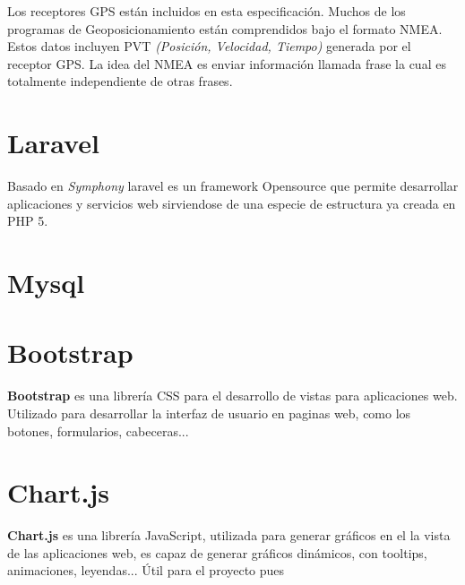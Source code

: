  Los receptores GPS están incluidos en esta especificación. Muchos de los programas de Geoposicionamiento están comprendidos bajo el formato NMEA. Estos datos incluyen PVT \textit{(Posición, Velocidad, Tiempo) }generada por el receptor GPS. La idea del NMEA es enviar información llamada frase la cual es totalmente independiente de otras frases.
 
\section{Laravel}


Basado en \textit{Symphony} laravel es un framework Opensource que permite desarrollar aplicaciones y servicios web sirviendose de una especie de estructura ya creada en PHP 5.

\section{Mysql}

\section{Bootstrap}

\textbf{Bootstrap} es una librería  CSS para el desarrollo de vistas para aplicaciones web. Utilizado para desarrollar la interfaz de usuario en paginas web, como los botones, formularios, cabeceras...

\section{Chart.js}

\textbf{Chart.js} es una librería JavaScript, utilizada para generar gráficos en el la vista de las aplicaciones web, es capaz de generar gráficos dinámicos, con tooltips, animaciones, leyendas... Útil para el proyecto pues 

